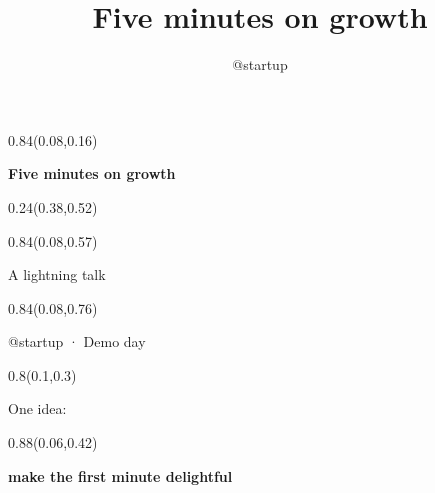 \documentclass[aspectratio=169]{beamer}
\title{Five minutes on growth}
\author{@startup}
\begin{document}
\begin{frame}[t]

\begin{textblock}{0.84}(0.08,0.16)
{\centering\fontsize{32}{38}\selectfont \textcolor[HTML]{F2F2F2}{\textbf{Five minutes on growth}}\par}
\end{textblock}

\begin{textblock}{0.24}(0.38,0.52)
\end{textblock}

\begin{textblock}{0.84}(0.08,0.57)
{\centering\fontsize{17}{20}\selectfont \textcolor[HTML]{BBBBBB}{A lightning talk}\par}
\end{textblock}

\begin{textblock}{0.84}(0.08,0.76)
{\centering\fontsize{13}{16}\selectfont \textcolor[HTML]{BBBBBB}{@startup  ·  Demo day}\par}
\end{textblock}
\end{frame}

\begin{frame}[t]

\begin{textblock}{0.8}(0.1,0.3)
{\centering\fontsize{20}{24}\selectfont \textcolor[HTML]{AAB4C8}{One idea:}\par}
\end{textblock}

\begin{textblock}{0.88}(0.06,0.42)
{\centering\fontsize{34}{41}\selectfont \textcolor[HTML]{F2C14E}{\textbf{make the first minute delightful}}\par}
\end{textblock}
\end{frame}
\end{document}
